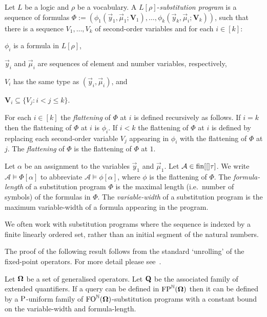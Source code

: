 \documentclass[../main/thesis.tex]{subfiles}
\begin{document}
\begin{definition}
  Let $L$ be a logic and $\rho$ be a vocabulary. A $L[\rho]$-\emph{substitution
    program} is a sequence of formulas $\Phi := (\phi_1(\vec{y}_1, \vec{\mu}_1;
  \boldsymbol{V}_1), \ldots, \phi_k(\vec{y}_k, \vec{\mu}_i;\boldsymbol{V}_k))$,
  such that there is a sequence $V_1, \ldots, V_k$ of second-order variables and
  for each $i \in [k]$:
  \begin{myitemize}
  \item $\phi_i$ is a formula in $L[\rho]$,
  \item $\vec{y}_i$ and $\vec{\mu}_i$ are sequences of element and number
    variables, respectively,
  \item $V_i$ has the same type as $(\vec{y}_i, \vec{\mu}_i)$, and
  \item $\boldsymbol{V}_i \subseteq \{V_j : i < j \leq k\}$.
  \end{myitemize}
  For each $i \in [k]$ the \emph{flattening} of $\Phi$ at $i$ is defined
  recursively as follows. If $i = k$ then the flattening of $\Phi$ at $i$ is
  $\phi_i$. If $i < k$ the flattening of $\Phi$ at $i$ is defined by replacing
  each second-order variable $V_j$ appearing in $\phi_i$ with the flattening of
  $\Phi$ at $j$. The \emph{flattening} of $\Phi$ is the flattening of $\Phi$ at
  $1$.

  Let $\alpha$ be an assignment to the variables $\vec{y}_1$ and $\vec{\mu}_1$.
  Let $\mathcal{A} \in \text{\upshape fin}{[[]}\tau]$. We write $\mathcal{A} \models \Phi[\alpha]$
  to abbreviate $\mathcal{A} \models \phi[\alpha]$, where $\phi$ is the
  flattening of $\Phi$. The \emph{formula-length} of a substitution program
  $\Phi$ is the maximal length (i.e.\ number of symbols) of the formulas in
  $\Phi$. The \emph{variable-width} of a substitution program is the maximum
  variable-width of a formula appearing in the program.
\end{definition}

We often work with substitution programs where the sequence is indexed by a
finite linearly ordered set, rather than an initial segment of the natural
numbers.

The proof of the following result follows from the standard `unrolling' of the
fixed-point operators. For more detail please see~\cite{}.

\begin{lem}
  Let $\mathbf{\mathbf{\Omega}}$ be a set of generalised operators. Let $\mathbf{Q}$ be the
  associated family of extended quantifiers. If a query can be defined in
  $\text{\upshape FP}^{\mathbb{N}} (\mathbf{\mathbf{\Omega}})$ then it can be defined by a $\mathrm{P}$-uniform family of
  $\text{\upshape FO}^{\mathbb{N}} (\mathbf{\mathbf{\Omega}})$-substitution programs with a constant bound on the
  variable-width and formula-length.
  \label{lem:unroll-fixed-point}
\end{lem}
\end{document}
